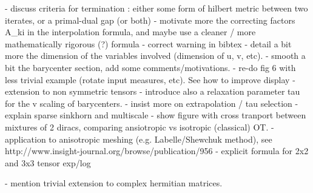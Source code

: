 - discuss criteria for termination : either some form of hilbert metric between two iterates, or a primal-dual gap (or both)
- motivate more the correcting factors A_ki in the interpolation formula, and maybe use a cleaner / more mathematically rigorous (?) formula 
- correct warning in bibtex
- detail a bit more the dimension of the variables involved (dimension of u, v, etc).
- smooth a bit the barycenter section, add some comments/motivations.
- re-do fig 6 with less trivial example (rotate input measures, etc). See how to improve display 
- extension to non symmetric tensors
- introduce also a relaxation parameter tau for the v scaling of barycenters.
- insist more on extrapolation / tau selection 
- explain sparse sinkhorn and multiscale
- show figure with cross tranport between mixtures of 2 diracs, comparing ansiotropic vs isotropic (classical) OT. 
- application to anisotropic meshing  (e.g. Labelle/Shewchuk method), see http://www.insight-journal.org/browse/publication/956
- explicit formula for 2x2 and 3x3 tensor exp/log

- mention trivial extension to complex hermitian matrices.